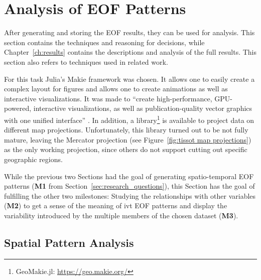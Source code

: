 \section{Analysis of EOF Patterns}
\label{sec:vis_analysis}

After generating and storing the EOF results, they can be used for analysis. 
This section contains the techniques and reasoning for decisions, while Chapter~\ref{ch:results} contains the descriptions and analysis of the full results. 
This section also refers to techniques used in related work. 

For this task Julia's Makie framework \cite{danisch_makiejl_2021} was chosen. 
It allows one to easily create a complex layout for figures and allows one to create animations as well as interactive visualizations. 
It was made to \enquote{create high-performance, GPU-powered, interactive visualizations, as well as publication-quality vector graphics with one unified interface} \cite{danisch_makiejl_2021}. 
In addition, a library\footnote{GeoMakie.jl: \url{https://geo.makie.org/}} is available to project data on different map projections. 
Unfortunately, this library turned out to be not fully mature, leaving the Mercator projection (see Figure~\ref{fig:tissot map projections}) as the only working projection, since others do not support cutting out specific geographic regions.  


While the previous two Sections had the goal of generating spatio-temporal EOF patterns (\textbf{M1} from Section~\ref{sec:research_questions}), this Section has the goal of fulfilling the other two milestones:  
Studying the relationships with other variables (\textbf{M2}) to get a sense of the meaning of \ac{ivt} EOF patterns and display the variability introduced by the multiple members of the chosen dataset (\textbf{M3}). 

\subsection{Spatial Pattern Analysis}
\label{sec:mode comparison}





